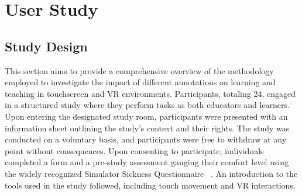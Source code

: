 \section{User Study}
\subsection{Study Design}

This section aims to provide a comprehensive overview of the methodology employed to investigate the impact of different annotations on learning and teaching in touchscreen and VR environments. Participants, totaling 24, engaged in a structured study where they perform tasks as both educators and learners. Upon entering the designated study room, participants were presented with an information sheet outlining the study's context and their rights. The study was conducted on a voluntary basis, and participants were free to withdraw at any point without consequences. Upon consenting to participate, individuals completed a form and a pre-study assessment gauging their comfort level using the widely recognized Simulator Sickness Questionnaire ~\cite{ssqOriginal, ssqFix}. An introduction to the tools used in the study followed, including touch movement and VR interactions.


